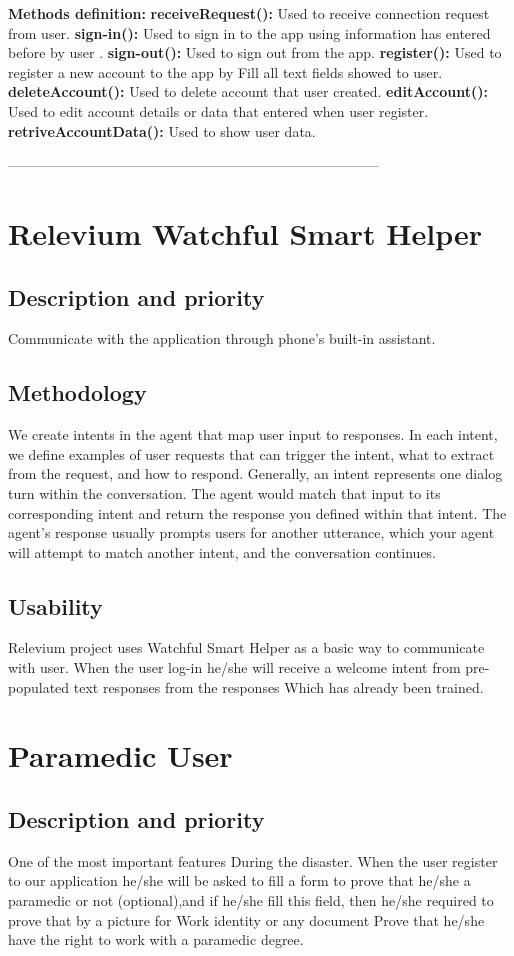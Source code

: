\textbf{Methods definition:}
\textbf{receiveRequest():} Used to receive connection request from user.
\textbf{sign-in():} Used to sign in to the app using information has entered before by user .
\textbf{sign-out():} Used to sign out from the app.
\textbf{register():} Used to register a new account to the app by Fill all text fields showed to user.
\textbf{deleteAccount():} Used to delete account that user created.
\textbf{editAccount():} Used to edit account details or data that entered when user register.
\textbf{retriveAccountData():} Used to show user data.


--------------------------------------------------------------------------------
\section{Relevium Watchful Smart Helper}

\subsection{Description and priority}
Communicate with the application through phone's built-in assistant.
\subsection{Methodology}
We create intents in the agent that map user input to responses. In each intent, we define examples of user requests that can trigger the intent, what to extract from the request, and how to respond. Generally, an intent represents one dialog turn within the conversation. The agent would match that input to its corresponding intent and return the response you defined within that intent. The agent’s response usually prompts users for another utterance, which your agent will attempt to match another intent, and the conversation continues.
\subsection{Usability}
Relevium project uses  Watchful Smart Helper as a basic way to communicate with user. When the user log-in he/she will receive a welcome intent from pre-populated text responses from the responses Which has already been trained.

\section{Paramedic User}
\subsection{Description and priority}
One of the most important features During the disaster. When the user register to our application he/she will be asked to fill a form to prove that he/she a paramedic or not (optional),and if he/she fill this field, then he/she required to prove that by a picture for Work identity or any document Prove that he/she have the right to work with a paramedic degree.
